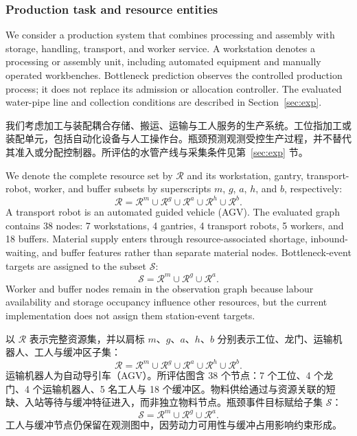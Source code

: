 \documentclass[a4paper,fleqn]{cas-dc}
\newcommand{\zhpara}[1]{%
  \par\begingroup\small\color{black!72}\noindent #1\par\endgroup}
\begin{document}
\subsubsection{Production task and resource entities}

We consider a production system that combines processing and assembly with storage, handling, transport, and worker service. A workstation denotes a processing or assembly unit, including automated equipment and manually operated workbenches. Bottleneck prediction observes the controlled production process; it does not replace its admission or allocation controller. The evaluated water-pipe line and collection conditions are described in Section~\ref{sec:exp}.

\zhpara{我们考虑加工与装配耦合存储、搬运、运输与工人服务的生产系统。工位指加工或装配单元，包括自动化设备与人工操作台。瓶颈预测观测受控生产过程，并不替代其准入或分配控制器。所评估的水管产线与采集条件见第~\ref{sec:exp} 节。}


We denote the complete resource set by $\mathcal{R}$ and its workstation, gantry, transport-robot, worker, and buffer subsets by superscripts $m$, $g$, $a$, $h$, and $b$, respectively:
\begin{equation}
\mathcal{R}=\mathcal{R}^{m}\cup\mathcal{R}^{g}\cup
\mathcal{R}^{a}\cup\mathcal{R}^{h}\cup\mathcal{R}^{b}.
\end{equation}
A transport robot is an automated guided vehicle (AGV). The evaluated graph contains 38 nodes: 7 workstations, 4 gantries, 4 transport robots, 5 workers, and 18 buffers. Material supply enters through resource-associated shortage, inbound-waiting, and buffer features rather than separate material nodes. Bottleneck-event targets are assigned to the subset $\mathcal{S}$:
\begin{equation}
\mathcal{S}=\mathcal{R}^{m}\cup\mathcal{R}^{g}\cup\mathcal{R}^{a}.
\end{equation}
Worker and buffer nodes remain in the observation graph because labour availability and storage occupancy influence other resources, but the current implementation does not assign them station-event targets.

\zhpara{以 $\mathcal{R}$ 表示完整资源集，并以肩标 $m$、$g$、$a$、$h$、$b$ 分别表示工位、龙门、运输机器人、工人与缓冲区子集：
\begin{equation}
\mathcal{R}=\mathcal{R}^{m}\cup\mathcal{R}^{g}\cup
\mathcal{R}^{a}\cup\mathcal{R}^{h}\cup\mathcal{R}^{b}.
\end{equation}
运输机器人为自动导引车（AGV）。所评估图含 38 个节点：7 个工位、4 个龙门、4 个运输机器人、5 名工人与 18 个缓冲区。物料供给通过与资源关联的短缺、入站等待与缓冲特征进入，而非独立物料节点。瓶颈事件目标赋给子集 $\mathcal{S}$：
\begin{equation}
\mathcal{S}=\mathcal{R}^{m}\cup\mathcal{R}^{g}\cup\mathcal{R}^{a}.
\end{equation}
工人与缓冲节点仍保留在观测图中，因劳动力可用性与缓冲占用影响约束形成。}
\end{document}
